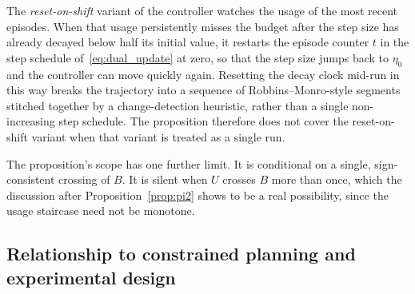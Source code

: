 The \emph{reset-on-shift} variant of the controller watches the usage of the most recent episodes. When that usage persistently misses the budget after the step size has already decayed below half its initial value, it restarts the episode counter $t$ in the step schedule of~\eqref{eq:dual_update} at zero, so that the step size jumps back to $\eta_0$ and the controller can move quickly again. Resetting the decay clock mid-run in this way breaks the trajectory into a sequence of Robbins--Monro-style segments stitched together by a change-detection heuristic, rather than a single non-increasing step schedule. The proposition therefore does not cover the reset-on-shift variant when that variant is treated as a single run.

The proposition's scope has one further limit. It is conditional on a single, sign-consistent crossing of $B$. It is silent when $U$ crosses $B$ more than once, which the discussion after Proposition~\ref{prop:pi2} shows to be a real possibility, since the usage staircase need not be monotone.

\subsection{Relationship to constrained planning and experimental design}
\label{app:theory_positioning}

